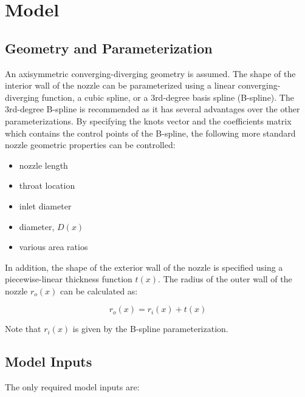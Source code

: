 \documentclass{article}
\begin{document}
\section{Model}

\subsection{Geometry and Parameterization}

An axisymmetric converging-diverging geometry is assumed. The shape of the interior wall of the nozzle can be parameterized using a linear converging-diverging function, a cubic spline, or a 3rd-degree basis spline (B-spline). The 3rd-degree B-spline is recommended as it has several advantages over the other parameterizations. By specifying the knots vector and the coefficients matrix which contains the control points of the B-spline, the following more standard nozzle geometric properties can be controlled:

\begin{itemize}
\item nozzle length
\item throat location
\item inlet diameter
\item diameter, $D(x)$
\item various area ratios
\end{itemize}

In addition, the shape of the exterior wall of the nozzle is specified using a piecewise-linear thickness function $t(x)$. The radius of the outer wall of the nozzle $r_o(x)$ can be calculated as:

\begin{equation}
r_o(x) = r_i(x) + t(x)
\end{equation}

Note that $r_i(x)$ is given by the B-spline parameterization.

\subsection{Model Inputs}

The only required model inputs are:
\end{document}
